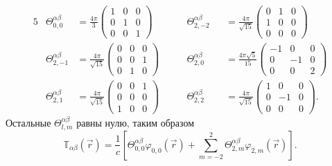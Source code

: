 \begin{alignat*}{5}
&\Theta^{\alpha\beta}_{0,0} &= \frac{4\pi}{3}\begin{pmatrix}
1 & 0 & 0\\
0 & 1 & 0\\
0 & 0 & 1
\end{pmatrix}\qquad
&\Theta^{\alpha\beta}_{2,-2} &&= \frac{4\pi}{\sqrt{15}}\begin{pmatrix}
0 & 1 & 0\\
1 & 0 & 0\\
0 & 0 & 0
\end{pmatrix}\\
&\Theta^{\alpha\beta}_{2,-1} &= \frac{4\pi}{\sqrt{15}}\begin{pmatrix}
0 & 0 & 0\\
0 & 0 & 1\\
0 & 1 & 0
\end{pmatrix}\qquad
&\Theta^{\alpha\beta}_{2,0} &&= \frac{4\pi\sqrt{5}}{15}\begin{pmatrix}
-1 & 0 & 0\\
0 & -1 & 0\\
0 & 0 & 2
\end{pmatrix}\\
&\Theta^{\alpha\beta}_{2,1} &= \frac{4\pi}{\sqrt{15}}\begin{pmatrix}
0 & 0 & 1\\
0 & 0 & 0\\
1 & 0 & 0
\end{pmatrix}\qquad
&\Theta^{\alpha\beta}_{2,2} &&= \frac{4\pi}{\sqrt{15}}\begin{pmatrix}
1 & 0 & 0\\
0 & -1 & 0\\
0 & 0 & 0
\end{pmatrix}.
\end{alignat*}
Остальные $\Theta^{\alpha\beta}_{l,m}$ равны нулю, таким образом
\[
\mathbb T_{\alpha\beta}(\vec r) = \frac{1}{c}\left[
\Theta^{\alpha\beta}_{0,0} \varphi_{0,0}(\vec r) + 
\sum_{m=-2}^{2} \Theta^{\alpha\beta}_{2,m} \varphi_{2,m}(\vec r)
\right].
\]

